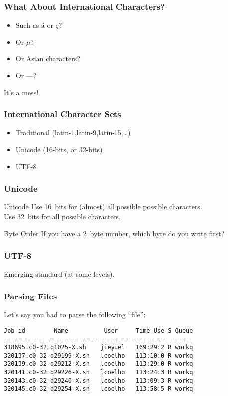 \begin{frame}[fragile]
\frametitle{What About International Characters?}

\begin{itemize}
\item Such as \'{a} or \c{c}?
\item Or $\mu$?
\item Or Asian characters?
\item Or ---?

\end{itemize}
It's a mess!
\end{frame}

\begin{frame}[fragile]
\frametitle{International Character Sets}

\begin{itemize}
\item Traditional (latin-1,latin-9,latin-15,\ldots)
\item Unicode (16-bits, or 32-bits)
\item UTF-8
\end{itemize}
\end{frame}

\begin{frame}[fragile]
\frametitle{Unicode}

\begin{block}{Unicode}
Use 16~bits for (almost) all possible possible characters.\\
Use 32~bits for all possible characters.
\end{block}

\begin{block}{Byte Order}
If you have a 2~byte number, which byte do you write first?
\end{block}

\end{frame}

\begin{frame}[fragile]
\frametitle{UTF-8}
Emerging standard (at some levels).
\end{frame}


\begin{frame}[fragile]
\frametitle{Parsing Files}
Let's say you had to parse the following ``file'':

\begin{verbatim}
Job id        Name          User     Time Use S Queue
----------- ------------- --------- -------- - -----
318695.c0-32 q1025-X.sh    jieyuel   169:29:2 R workq
320137.c0-32 q29199-X.sh   lcoelho   113:10:0 R workq
320139.c0-32 q29212-X.sh   lcoelho   113:29:0 R workq
320141.c0-32 q29226-X.sh   lcoelho   113:24:3 R workq
320143.c0-32 q29240-X.sh   lcoelho   113:09:3 R workq
320145.c0-32 q29254-X.sh   lcoelho   113:58:5 R workq
\end{verbatim}
\end{frame}

